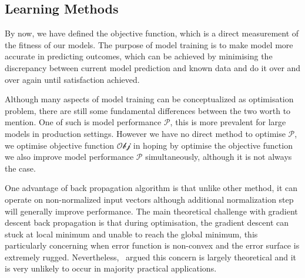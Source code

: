 \subsection {Learning Methods}
By now, we have defined the objective function, which is a direct measurement of the fitness of our models. The purpose of model training is to make model more accurate in predicting outcomes, which can be achieved by minimising the discrepancy between current model prediction and known data and do it over and over again until satisfaction achieved. 
\par 
Although many aspects of model training can be conceptualized as optimisation problem, there are still some fundamental differences between the two worth to mention. One of such is model performance $\mathcal{P}$, this is more prevalent for large models in production settings. However we have no direct method to optimise $\mathcal{P}$, we optimise objective function $\mathcal{Obj}$ in hoping by optimise the objective function we also improve model performance $\mathcal{P}$ simultaneously, although it is not always the case.  

One advantage of back propagation algorithm is that unlike other method, it can operate on non-normalized input vectors although additional normalization step will generally improve performance. \cite{Buckland:2002} The main theoretical challenge with gradient descent back propagation is that during optimisation, the gradient descent can stuck at local minimum and unable to reach the global minimum, this particularly concerning when error function is non-convex and the error surface is extremely rugged. Nevertheless,~\citet{LeCun_2015} argued this concern is largely theoretical and it is very unlikely to occur in majority practical applications. 